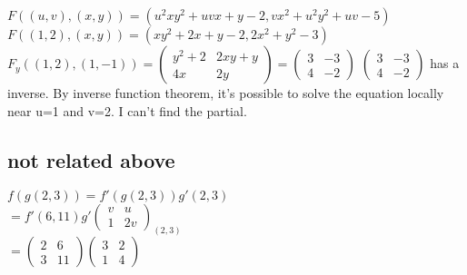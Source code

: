 \documentclass[letter]{article}
\begin{document}
\section{}
$F((u,v),(x,y)) = (u^2xy^2+uvx+y-2,vx^2+u^2y^2+uv-5)$
$F((1,2),(x,y)) = (xy^2+2x+y-2,2x^2+y^2-3)$
$F_y((1,2),(1,-1)) = \begin{pmatrix}y^2+2 & 2xy+y\\ 4x & 2y\end{pmatrix} =
\begin{pmatrix}3 & -3\\ 4 & -2\end{pmatrix}$
$\begin{pmatrix}3 & -3\\ 4 & -2\end{pmatrix}$ has a inverse.
By inverse function theorem, it's possible to solve the equation locally near
u=1 and v=2.
I can't find the partial.

\subsection*{not related above}

$f(g(2,3)) = f'(g(2,3))g'(2,3)$\\
$=f'(6,11)g'\begin{pmatrix}v & u\\ 1 & 2v\end{pmatrix}_{(2,3)}$\\
$= \begin{pmatrix}2 & 6\\ 3 & 11\end{pmatrix}
\begin{pmatrix}3 & 2\\ 1 &
4\end{pmatrix}$
\end{document}
